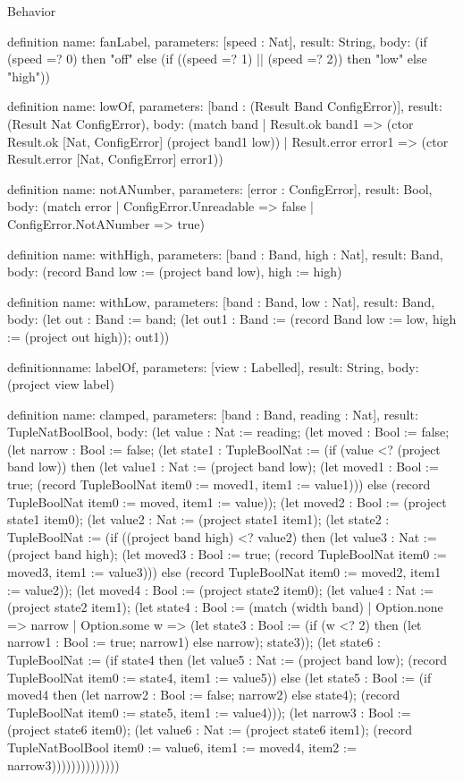 \begin{lexlean}{Behavior}
\begin{semanticmodule}
definition{
  name: fanLabel,
  parameters: [speed : Nat],
  result: String,
  body: (if (speed =? 0) then "off" else (if ((speed =? 1) || (speed =? 2)) then "low" else "high"))
}

definition{
  name: lowOf,
  parameters: [band : (Result Band ConfigError)],
  result: (Result Nat ConfigError),
  body: (match band
    | Result.ok band1 => (ctor Result.ok [Nat, ConfigError] (project band1 low))
    | Result.error error1 => (ctor Result.error [Nat, ConfigError] error1))
}

definition{
  name: notANumber,
  parameters: [error : ConfigError],
  result: Bool,
  body: (match error | ConfigError.Unreadable => false | ConfigError.NotANumber => true)
}

definition{
  name: withHigh,
  parameters: [band : Band, high : Nat],
  result: Band,
  body: (record Band {low := (project band low), high := high})
}

definition{
  name: withLow,
  parameters: [band : Band, low : Nat],
  result: Band,
  body: (let out : Band := band; (let out1 : Band := (record Band {low := low, high := (project out high)}); out1))
}

definition{name: labelOf, parameters: [view : Labelled], result: String, body: (project view label)}

definition{
  name: clamped,
  parameters: [band : Band, reading : Nat],
  result: TupleNatBoolBool,
  body: (let value : Nat := reading; (let moved : Bool := false; (let narrow : Bool := false; (let state1 : TupleBoolNat := (if (value <? (project band low)) then (let value1 : Nat := (project band low); (let moved1 : Bool := true; (record TupleBoolNat {item0 := moved1, item1 := value1}))) else (record TupleBoolNat {item0 := moved, item1 := value})); (let moved2 : Bool := (project state1 item0); (let value2 : Nat := (project state1 item1); (let state2 : TupleBoolNat := (if ((project band high) <? value2) then (let value3 : Nat := (project band high); (let moved3 : Bool := true; (record TupleBoolNat {item0 := moved3, item1 := value3}))) else (record TupleBoolNat {item0 := moved2, item1 := value2})); (let moved4 : Bool := (project state2 item0); (let value4 : Nat := (project state2 item1); (let state4 : Bool := (match (width band)
    | Option.none => narrow
    | Option.some w => (let state3 : Bool := (if (w <? 2) then (let narrow1 : Bool := true; narrow1) else narrow); state3)); (let state6 : TupleBoolNat := (if state4 then (let value5 : Nat := (project band low); (record TupleBoolNat {item0 := state4, item1 := value5})) else (let state5 : Bool := (if moved4 then (let narrow2 : Bool := false; narrow2) else state4); (record TupleBoolNat {item0 := state5, item1 := value4}))); (let narrow3 : Bool := (project state6 item0); (let value6 : Nat := (project state6 item1); (record TupleNatBoolBool {item0 := value6, item1 := moved4, item2 := narrow3}))))))))))))))
}


\end{semanticmodule}
\end{lexlean}
